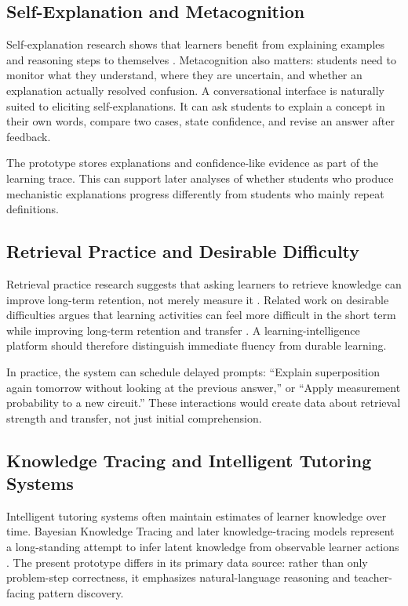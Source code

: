 \documentclass[11pt]{article}
\begin{document}
\subsection{Self-Explanation and Metacognition}

Self-explanation research shows that learners benefit from explaining examples and reasoning steps to themselves \cite{chi1989self}. Metacognition also matters: students need to monitor what they understand, where they are uncertain, and whether an explanation actually resolved confusion. A conversational interface is naturally suited to eliciting self-explanations. It can ask students to explain a concept in their own words, compare two cases, state confidence, and revise an answer after feedback.

The prototype stores explanations and confidence-like evidence as part of the learning trace. This can support later analyses of whether students who produce mechanistic explanations progress differently from students who mainly repeat definitions.

\subsection{Retrieval Practice and Desirable Difficulty}

Retrieval practice research suggests that asking learners to retrieve knowledge can improve long-term retention, not merely measure it \cite{roediger2006test}. Related work on desirable difficulties argues that learning activities can feel more difficult in the short term while improving long-term retention and transfer \cite{bjork1994memory}. A learning-intelligence platform should therefore distinguish immediate fluency from durable learning.

In practice, the system can schedule delayed prompts: ``Explain superposition again tomorrow without looking at the previous answer,'' or ``Apply measurement probability to a new circuit.'' These interactions would create data about retrieval strength and transfer, not just initial comprehension.

\subsection{Knowledge Tracing and Intelligent Tutoring Systems}

Intelligent tutoring systems often maintain estimates of learner knowledge over time. Bayesian Knowledge Tracing and later knowledge-tracing models represent a long-standing attempt to infer latent knowledge from observable learner actions \cite{corbett1994knowledge, abdelrahman2022survey}. The present prototype differs in its primary data source: rather than only problem-step correctness, it emphasizes natural-language reasoning and teacher-facing pattern discovery.
\end{document}
